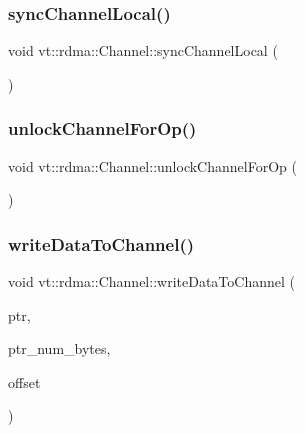 \mbox{\label{structvt_1_1rdma_1_1_channel_a5ce567dd26c64a6d8a8ea9a9b3d525f8}} 
\subsubsection{\texorpdfstring{sync\+Channel\+Local()}{syncChannelLocal()}}
{\footnotesize\ttfamily void vt\+::rdma\+::\+Channel\+::sync\+Channel\+Local (\begin{DoxyParamCaption}{ }\end{DoxyParamCaption})}

\mbox{\label{structvt_1_1rdma_1_1_channel_adb5c10cdeb4e72e54433622091b543c6}} 
\subsubsection{\texorpdfstring{unlock\+Channel\+For\+Op()}{unlockChannelForOp()}}
{\footnotesize\ttfamily void vt\+::rdma\+::\+Channel\+::unlock\+Channel\+For\+Op (\begin{DoxyParamCaption}{ }\end{DoxyParamCaption})}

\mbox{\label{structvt_1_1rdma_1_1_channel_af7d6fb54933f6ad3d12cb600ababfa18}} 
\subsubsection{\texorpdfstring{write\+Data\+To\+Channel()}{writeDataToChannel()}}
{\footnotesize\ttfamily void vt\+::rdma\+::\+Channel\+::write\+Data\+To\+Channel (\begin{DoxyParamCaption}\item[{\hyperlink{namespacevt_a9e2c953286c7616f7c218e9951790776}{R\+D\+M\+A\+\_\+\+Ptr\+Type} const \&}]{ptr,  }\item[{\hyperlink{namespacevt_aab8d55968084610ce3b17057981e9300}{Byte\+Type} const \&}]{ptr\+\_\+num\+\_\+bytes,  }\item[{\hyperlink{namespacevt_aab8d55968084610ce3b17057981e9300}{Byte\+Type} const \&}]{offset }\end{DoxyParamCaption})}




